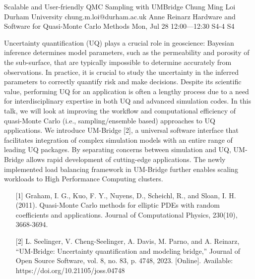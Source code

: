 \begin{talk}
  {Scalable and User-friendly QMC Sampling with UMBridge}%
  {Chung Ming Loi}%
  {Durham University}%
  {chung.m.loi@durham.ac.uk}%
  {Anne Reinarz}%
  {Hardware and Software for Quasi-Monte Carlo Methods}%
  {Mon, Jul 28 12:00---12:30}%
  {S4-4}%
  {S4}%
    
   
Uncertainty quantification (UQ) plays a crucial role in geoscience: Bayesian inference determines model parameters, such as the permeability and porosity of the sub-surface, that are typically impossible to determine accurately from observations. In practice, it is crucial to study the uncertainty in the inferred parameters to correctly quantify risk and make decisions. Despite its scientific value, performing UQ for an application is often a lengthy process due to a need for interdisciplinary expertise in both UQ and advanced simulation codes. In this talk, we will look at improving the workflow and computational efficiency of quasi-Monte Carlo (i.e., sampling/ensemble based) approaches to UQ applications. We introduce UM-Bridge [2], a universal software interface that facilitates integration of complex simulation models with an entire range of leading UQ packages. By separating concerns between simulation and UQ, UM-Bridge allows rapid development of cutting-edge applications. The newly implemented load balancing framework in UM-Bridge further enables scaling workloads to High Performance Computing clusters.

\begin{enumerate}
    \item[{[1]}] Graham, I. G., Kuo, F. Y., Nuyens, D., Scheichl, R., and Sloan, I. H. (2011). Quasi-Monte Carlo methods for elliptic PDEs with random coefficients and applications. Journal of Computational Physics, 230(10), 3668-3694.
    \item[{[2]}]  L. Seelinger, V. Cheng-Seelinger, A. Davis, M. Parno, and A. Reinarz, “UM-Bridge: Uncertainty quantification and modeling bridge,” Journal of Open Source Software, vol. 8, no. 83, p. 4748, 2023. [Online]. Available: https://doi.org/10.21105/joss.04748
\end{enumerate}

\end{talk}

